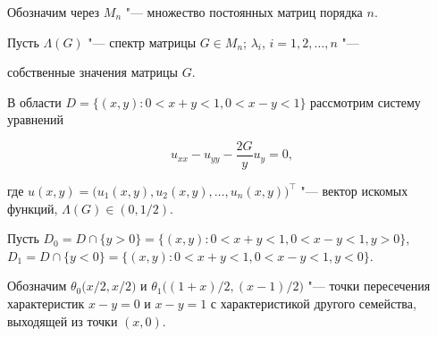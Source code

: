 


\date{29/X/2012} %







\maketitle



Обозначим через $M_{n}$ "--- множество постоянных матриц порядка $n$.

Пусть $\Lambda(G)$ "--- спектр матрицы $G \in M_{n}$; $\lambda_{i}$, $i=1, 2, \dots, n$ "---

собственные значения матрицы $G$.



В области $D=\{(x,y):0<x+y<1, 0<x-y<1\}$ рассмотрим систему уравнений

\begin{equation}

\label{isririri:3.1}

u_{xx}-u_{yy}-\frac{2G}{y}u_y=0,

\end{equation}

где $u(x,y)=\bigl(u_{1}(x,y),u_{2}(x,y),\ldots,u_{n}(x,y)\bigr)^{\top}$ "--- вектор искомых функций, \linebreak $\Lambda(G)\in(0, 1/2)$.



Пусть $D_{0}=D\cap\{y>0\}=\{(x,y):0<x+y<1, 0<x-y<1, y>0\}$, $D_{1}=D\cap\{y<0\}=\{(x,y):0<x+y<1, 0<x-y<1, y<0\}$.



Обозначим $\theta_{0}\bigl({x}/{2}, {x}/{2}\bigr)$ и $\theta_{1}\bigl(({1+x})/{2}, ({x-1})/{2}\bigr)$ "--- точки пересечения характеристик $x-y=0$ и $x-y=1$ с характеристикой другого семейства, выходящей из точки $(x, 0)$.



\smallskip



